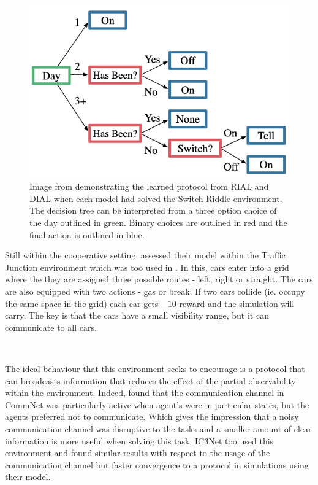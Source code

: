 \documentclass{article}
\begin{document}
\begin{figure}
	\centering
	\includegraphics{images/switch_riddle}
	\caption{Image from \citet{foerster2016learning} demonstrating the learned protocol from RIAL and DIAL when each model had solved the Switch Riddle environment. The decision tree can be interpreted from a three option choice of the day outlined in green. Binary choices are outlined in red and the final action is outlined in blue. }
	\label{fig:switch_riddle_solution}
\end{figure}

Still within the cooperative setting, \citet{sukhbaatar2016commnet} assessed their model within the Traffic Junction environment which was too used in \citet{singh2018ic3net}. In this, cars enter into a grid where the they are assigned three possible routes - left, right or straight. The cars are also equipped with two actions - gas or break. If two cars collide (ie. occupy the same space in the grid) each car gets $-10$ reward and the simulation will carry. The key is that the cars have a small visibility range, but it can communicate to all cars.

\

The ideal behaviour that this environment seeks to encourage is a protocol that can broadcasts information that reduces the effect of the partial observability within the environment. Indeed, \citet{sukhbaatar2016commnet} found that the communication channel in CommNet was particularly active when agent's were in particular states, but the agents preferred not to communicate. Which gives the impression that a noisy communication channel was disruptive to the tasks and a smaller amount of clear information is more useful when solving this task. IC3Net \citep{singh2018ic3net} too used this environment and found similar results with respect to the usage of the communication channel but faster convergence to a protocol in simulations using their model.
\end{document}
